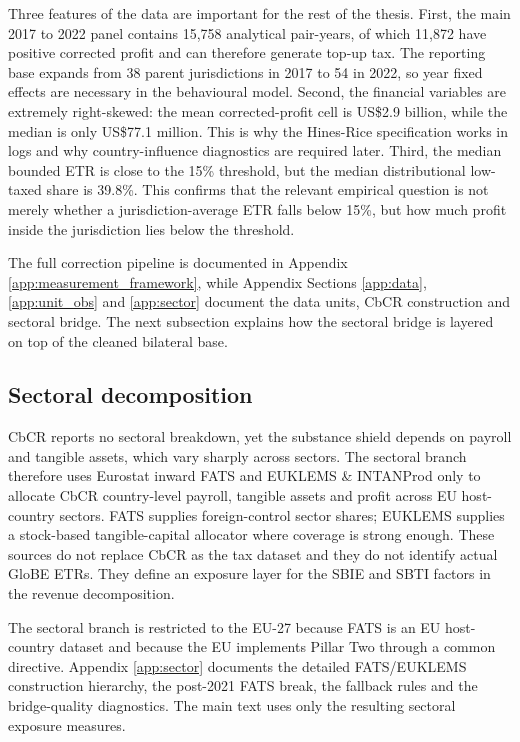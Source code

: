 \documentclass[11pt,a4paper]{article}
\begin{document}
Three features of the data are important for the rest of the thesis. First, the main 2017 to 2022 panel contains 15{,}758 analytical pair-years, of which 11{,}872 have positive corrected profit and can therefore generate top-up tax. The reporting base expands from 38 parent jurisdictions in 2017 to 54 in 2022, so year fixed effects are necessary in the behavioural model. Second, the financial variables are extremely right-skewed: the mean corrected-profit cell is US\$2.9 billion, while the median is only US\$77.1 million. This is why the Hines-Rice specification works in logs and why country-influence diagnostics are required later. Third, the median bounded ETR is close to the 15\% threshold, but the median distributional low-taxed share is 39.8\%. This confirms that the relevant empirical question is not merely whether a jurisdiction-average ETR falls below 15\%, but how much profit inside the jurisdiction lies below the threshold.

The full correction pipeline is documented in Appendix \ref{app:measurement_framework}, while Appendix Sections \ref{app:data}, \ref{app:unit_obs} and \ref{app:sector} document the data units, CbCR construction and sectoral bridge. The next subsection explains how the sectoral bridge is layered on top of the cleaned bilateral base.

\subsection{Sectoral decomposition}\label{sec:sectoral_data}

CbCR reports no sectoral breakdown, yet the substance shield depends on payroll and tangible assets, which vary sharply across sectors. The sectoral branch therefore uses Eurostat inward FATS and EUKLEMS \& INTANProd only to allocate CbCR country-level payroll, tangible assets and profit across EU host-country sectors. FATS supplies foreign-control sector shares; EUKLEMS supplies a stock-based tangible-capital allocator where coverage is strong enough. These sources do not replace CbCR as the tax dataset and they do not identify actual GloBE ETRs. They define an exposure layer for the SBIE and SBTI factors in the revenue decomposition.

The sectoral branch is restricted to the EU-27 because FATS is an EU host-country dataset and because the EU implements Pillar Two through a common directive. Appendix \ref{app:sector} documents the detailed FATS/EUKLEMS construction hierarchy, the post-2021 FATS break, the fallback rules and the bridge-quality diagnostics. The main text uses only the resulting sectoral exposure measures.
\end{document}
